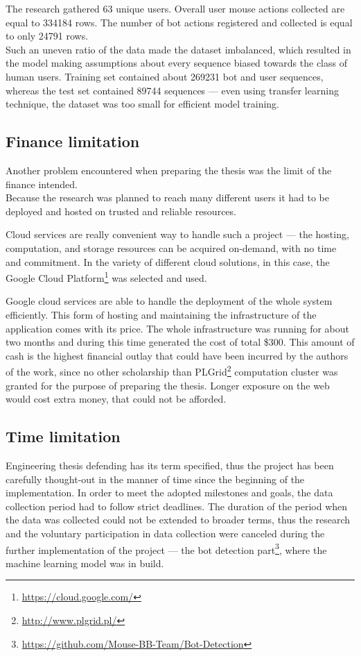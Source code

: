 The research gathered \num{63} unique users.
Overall user mouse actions collected are equal to \num{334184} rows.
The number of bot actions registered and collected is equal to only \num{24791} rows.\\
Such an uneven ratio of the data made the dataset imbalanced, which resulted in the model making assumptions about every sequence biased towards the class of human users.
Training set contained about \num{269231} bot and user sequences, whereas the test set contained \num{89744} sequences --- even using transfer learning technique, the dataset was too small for efficient model training.

\subsection{Finance limitation}\label{subsec:finance-limitation}
Another problem encountered when preparing the thesis was the limit of the finance intended.\\
Because the research was planned to reach many different users it had to be deployed and hosted on trusted and reliable resources.

Cloud services are really convenient way to handle such a project --- the hosting, computation, and storage resources can be acquired on-demand, with no time and commitment.
In the variety of different cloud solutions, in this case, the Google Cloud Platform\footnote{\url{https://cloud.google.com/}} was selected and used.

Google cloud services are able to handle the deployment of the whole system efficiently.
This form of hosting and maintaining the infrastructure of the application comes with its price.
The whole infrastructure was running for about two months and during this time generated the cost of total \$\num{300}.
This amount of cash is the highest financial outlay that could have been incurred by the authors of the work, since no other scholarship than PLGrid\footnote{\url{http://www.plgrid.pl/}} computation cluster was granted for the purpose of preparing the thesis.
Longer exposure on the web would cost extra money, that could not be afforded.

\subsection{Time limitation}\label{subsec:time-limitation}
Engineering thesis defending has its term specified, thus the project has been carefully thought-out in the manner of time since the beginning of the implementation.
In order to meet the adopted milestones and goals, the data collection period had to follow strict deadlines.
The duration of the period when the data was collected could not be extended to broader terms, thus the research and the voluntary participation in data collection were canceled during the further implementation of the project --- the bot detection part\footnote{\url{https://github.com/Mouse-BB-Team/Bot-Detection}}, where the machine learning model was in build.

